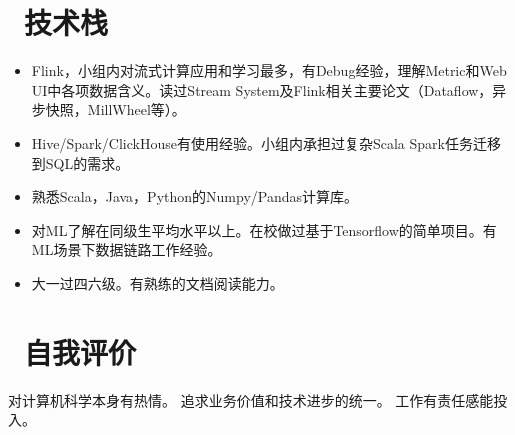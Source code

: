 \documentclass{resume}
\begin{document}
\section{\faCogs\ 技术栈}
\begin{itemize}[parsep=0.5ex]
  \item Flink，小组内对流式计算应用和学习最多，有Debug经验，理解Metric和Web UI中各项数据含义。读过Stream System及Flink相关主要论文（Dataflow，异步快照，MillWheel等）。
  \item Hive/Spark/ClickHouse有使用经验。小组内承担过复杂Scala Spark任务迁移到SQL的需求。
  \item 熟悉Scala，Java，Python的Numpy/Pandas计算库。
  \item 对ML了解在同级生平均水平以上。在校做过基于Tensorflow的简单项目。有ML场景下数据链路工作经验。
  \item 大一过四六级。有熟练的文档阅读能力。

  
\end{itemize}

\section{\faInfo\ 自我评价}
\begin{onehalfspacing}
对计算机科学本身有热情。
追求业务价值和技术进步的统一。
工作有责任感能投入。
\end{onehalfspacing}

%
%
\end{document}

